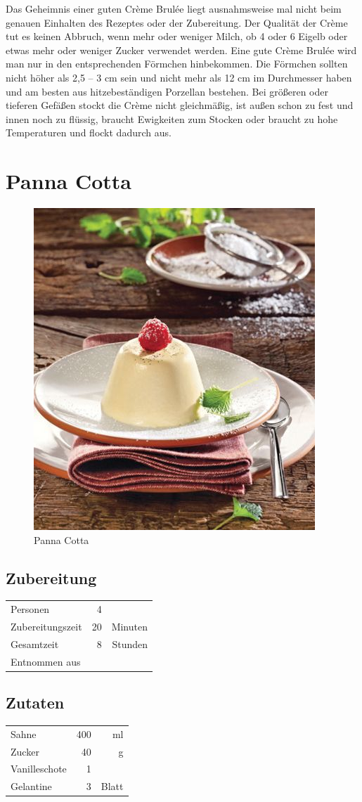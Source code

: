 Das Geheimnis einer guten Crème Brulée liegt ausnahmsweise mal nicht beim genauen Einhalten des Rezeptes oder der Zubereitung. Der Qualität der Crème tut es keinen Abbruch, wenn mehr oder weniger Milch, ob 4 oder 6 Eigelb oder etwas mehr oder weniger Zucker verwendet werden. Eine gute Crème Brulée wird man nur in den entsprechenden Förmchen hinbekommen. Die Förmchen sollten nicht höher als 2,5 – 3 cm sein und nicht mehr als 12 cm im Durchmesser haben und am besten aus hitzebeständigen Porzellan bestehen. Bei größeren oder tieferen Gefäßen stockt die Crème nicht gleichmäßig, ist außen schon zu fest und innen noch zu flüssig, braucht Ewigkeiten zum Stocken oder braucht zu hohe Temperaturen und flockt dadurch aus.

\section{Panna Cotta}
\begin{figure}[H]
\centering
\includegraphics[width=0.4\linewidth]{Bilder/PannaCotta}
\caption{Panna Cotta}
\label{fig:PannaCotta}
\end{figure}

\subsection*{Zubereitung}
\begin{tabular}{lrr}
	Personen         &                        4 &  \\
	Zubereitungszeit &                       20 & Minuten \\
	Gesamtzeit       &                        8 & Stunden \\
	Entnommen aus    & \cite{Naumann2016} &
\end{tabular} 

\subsection*{Zutaten}
\begin{tabular}{lrr}
	Sahne         & 400 &   ml \\
	Zucker        &  40 &    g \\
	Vanilleschote &   1 &  \\
	Gelantine     &   3 & Blatt
\end{tabular} 


